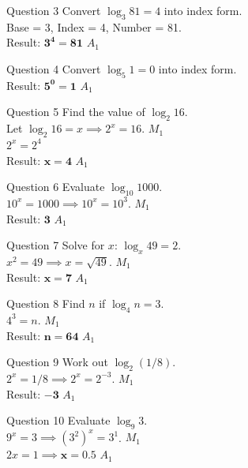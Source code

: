\documentclass[12pt, a4paper, oneside]{article}
\begin{document}
\begin{solvingbox}{Question 3}
Convert \textbf{$\log_3 81 = 4$} into index form. \\
Base = 3, Index = 4, Number = 81. \\
Result: $\mathbf{3^4 = 81}$ \hfill $A_1$
\end{solvingbox}

\begin{solvingbox}{Question 4}
Convert \textbf{$\log_5 1 = 0$} into index form. \\
Result: $\mathbf{5^0 = 1}$ \hfill $A_1$
\end{solvingbox}

\begin{solvingbox}{Question 5}
Find the value of \textbf{$\log_2 16$}. \\
Let $\log_2 16 = x \implies 2^x = 16$. \hfill $M_1$ \\
$2^x = 2^4$ \\
Result: $\mathbf{x = 4}$ \hfill $A_1$
\end{solvingbox}

\begin{solvingbox}{Question 6}
Evaluate \textbf{$\log_{10} 1000$}. \\
$10^x = 1000 \implies 10^x = 10^3$. \hfill $M_1$ \\
Result: $\mathbf{3}$ \hfill $A_1$
\end{solvingbox}

\begin{solvingbox}{Question 7}
Solve for $x$: $\log_x 49 = 2$. \\
$x^2 = 49 \implies x = \sqrt{49}$. \hfill $M_1$ \\
Result: $\mathbf{x = 7}$ \hfill $A_1$
\end{solvingbox}

\begin{solvingbox}{Question 8}
Find $n$ if $\log_4 n = 3$. \\
$4^3 = n$. \hfill $M_1$ \\
Result: $\mathbf{n = 64}$ \hfill $A_1$
\end{solvingbox}

\begin{solvingbox}{Question 9}
Work out \textbf{$\log_2 (1/8)$}. \\
$2^x = 1/8 \implies 2^x = 2^{-3}$. \hfill $M_1$ \\
Result: $\mathbf{-3}$ \hfill $A_1$
\end{solvingbox}

\begin{solvingbox}{Question 10}
Evaluate \textbf{$\log_9 3$}. \\
$9^x = 3 \implies (3^2)^x = 3^1$. \hfill $M_1$ \\
$2x = 1 \implies \mathbf{x = 0.5}$ \hfill $A_1$
\end{solvingbox}
\newpage
\end{document}
